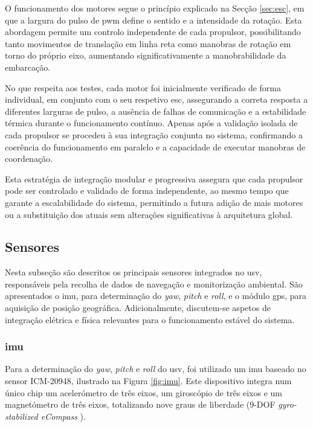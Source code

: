 O funcionamento dos motores segue o princípio explicado na Secção \ref{sec:esc}, em que a largura do pulso de \gls{pwm} define o sentido e a intensidade da rotação. Esta abordagem permite um controlo independente de cada propulsor, possibilitando tanto movimentos de translação em linha reta como manobras de rotação em torno do próprio eixo, aumentando significativamente a manobrabilidade da embarcação.  

No que respeita aos testes, cada motor foi inicialmente verificado de forma individual, em conjunto com o seu respetivo \gls{esc}, assegurando a correta resposta a diferentes larguras de pulso, a ausência de falhas de comunicação e a estabilidade térmica durante o funcionamento contínuo. Apenas após a validação isolada de cada propulsor se procedeu à sua integração conjunta no sistema, confirmando a coerência do funcionamento em paralelo e a capacidade de executar manobras de coordenação.  

Esta estratégia de integração modular e progressiva assegura que cada propulsor pode ser controlado e validado de forma independente, ao mesmo tempo que garante a escalabilidade do sistema, permitindo a futura adição de mais motores ou a substituição dos atuais sem alterações significativas à arquitetura global.

\subsection{Sensores}
\label{subsec:sensores}

Nesta subseção são descritos os principais sensores integrados no \gls{usv}, responsáveis pela recolha de dados de navegação e monitorização ambiental. São apresentados o \gls{imu}, para determinação do \emph{yaw}, \emph{pitch} e \emph{roll}, e o módulo \gls{gps}, para aquisição de posição geográfica. Adicionalmente, discutem-se aspetos de integração elétrica e física relevantes para o funcionamento estável do sistema.

\subsubsection{\acrfull{imu}}

Para a determinação do \emph{yaw}, \emph{pitch} e \emph{roll} do \gls{usv}, foi utilizado um \gls{imu} baseado no sensor ICM-20948, ilustrado na Figura \ref{fig:imu}. Este dispositivo integra num único chip um acelerómetro de três eixos, um giroscópio de três eixos e um magnetómetro de três eixos, totalizando nove graus de liberdade (9-DOF \emph{gyro-stabilized eCompass} \cite{9dof}). 

